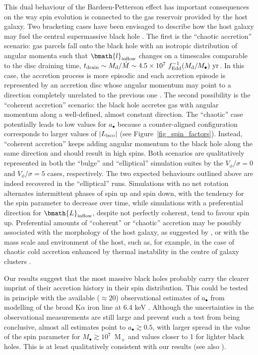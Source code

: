 \documentclass[a4paper,fleqn,usenatbib]{mnras}
\begin{document}
This dual behaviour of the Bardeen-Petterson effect has important consequences on the way spin evolution is connected to the gas reservoir provided by the host galaxy.
Two bracketing cases have been envisaged to describe how the host galaxy may fuel the central supermassive black hole \citep{king+06,king_pringle+07}.
The first is the ``chaotic accretion'' scenario: gas parcels fall onto the black hole with an isotropic distribution of angular momenta such that $\bmath{l}_{\rm inflow}$ changes on a timescales comparable to the disc draining time, $t_{\rm drain} \sim M_{\rm d}/\dot{M}\sim 4.5 \times 10^{7}~f_{\rm Edd}^{-1} (M_{\rm d}/M_{\bullet})~{\rm yr}$.
In this case, the accretion process is more episodic and each accretion episode is represented by an accretion disc whose angular momentum may point to a direction completely unrelated to the previous one \citep{king+06,king_pringle+07}.
The second possibility is the ``coherent accretion'' scenario: the black hole accretes gas with angular momentum along a well-defined, almost constant direction.
The ``chaotic'' case potentially leads to low values for $a_{\bullet}$ because a counter-aligned configuration corresponds to larger values of $|L_{\rm isco}|$ (see Figure~\ref{fig_spin_factors}).
Instead, ``coherent accretion'' keeps adding angular momentum to the black hole along the same direction and should result in high spins.
Both scenarios are qualitatively represented in both the ``bulge'' and ``elliptical'' simulation suites by the $V_{\phi} / \sigma = 0$ and $V_{\phi} / \sigma = 5$ cases, respectively.
The two expected behaviours outlined above are indeed recovered in the ``elliptical'' runs.
Simulations with no net rotation alternates intermittent phases of spin up and spin down, with the tendency for the spin parameter to decrease over time, while simulations with a preferential direction for $\bmath{L}_{\rm inflow}$, despite not perfectly coherent, tend to favour spin up.
Preferential amounts of ``coherent'' or ``chaotic'' accretion may be possibly associated with the morphology of the host galaxy, as suggested by \citet{sesana+14}, or with the mass scale and environment of the host, such as, for example, in the case of chaotic cold accretion enhanced by thermal instability in the centre of galaxy clusters \citep{pizzolato+10,mccourt+12,sharma+12,gaspari+13}.

Our results suggest that the most massive black holes probably carry the clearer imprint of their accretion history in their spin distribution.
This could be tested in principle with the available ($\approx 20$) observational estimates of $a_{\bullet}$ from modelling of the broad K$\alpha$ iron line at 6.4 keV \citep{brenneman+13, reynolds+14}.
Although the uncertainties in the observational measurements are still large and prevent such a test from being conclusive, almost all estimates point to $a_{\bullet} \gtrsim 0.5$, with larger spread in the value of the spin parameter for $M_{\bullet} \gtrsim 10^7$~M$_{\sun}$ and values closer to 1 for lighter black holes.
This is at least qualitatively consistent with our results (see also \citealt{sesana+14}).
\end{document}
